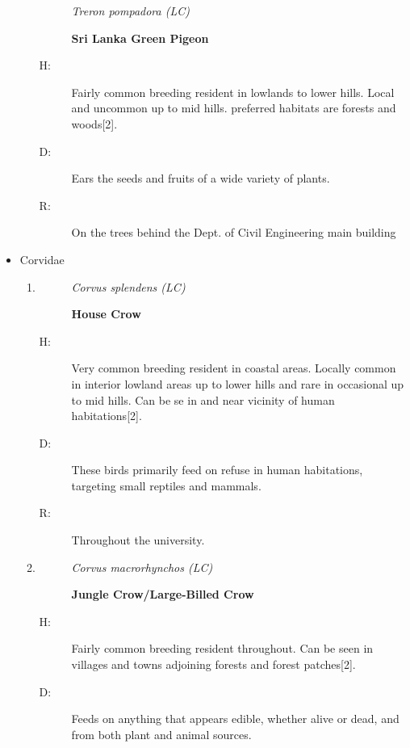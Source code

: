 \begin{itemize}
\begin{enumerate}
\begin{description}
\item[]%
\textit{Treron pompadora (LC)}%
\item[]%
\textbf{Sri Lanka Green Pigeon}%
\end{description}%
\begin{description}%
\item[H: ]%
Fairly common breeding resident in lowlands to lower hills. Local and uncommon up to mid hills. preferred habitats are forests and woods{[}2{]}.%
\item[D: ]%
 Ears the seeds and fruits of a wide variety of plants.%
\item[R: ]%
On the trees behind the Dept. of Civil Engineering main building%
\end{description}%
\end{enumerate}%
\item%
Corvidae%
\begin{enumerate}%
\item%
\begin{description}%
\item[]%
\textit{Corvus splendens (LC)}%
\item[]%
\textbf{House Crow}%
\end{description}%
\begin{description}%
\item[H: ]%
Very common breeding resident in coastal areas. Locally common in interior lowland areas up to lower hills and rare in occasional up to mid hills. Can be se in and near vicinity of human habitations{[}2{]}.%
\item[D: ]%
These birds primarily feed on refuse in human habitations, targeting small reptiles and mammals. %
\item[R: ]%
Throughout the university. %
\end{description}%
\item%
\begin{description}%
\item[]%
\textit{Corvus macrorhynchos (LC)}%
\item[]%
\textbf{Jungle Crow/Large{-}Billed Crow}%
\end{description}%
\begin{description}%
\item[H: ]%
Fairly common breeding resident throughout. Can be seen in villages and towns adjoining forests and forest patches{[}2{]}.%
\item[D: ]%
Feeds on anything that appears edible, whether alive or dead, and from both plant and animal sources.%

\end{description}
\end{enumerate}
\end{itemize}
